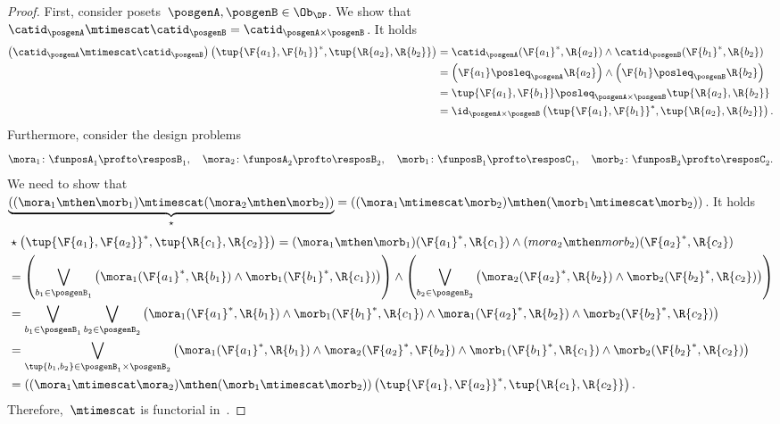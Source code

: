 \begin{proof}
  First, consider posets~$\posgenA,\posgenB\in \Ob_\DP$. We show that~$\catid_\posgenA\mtimescat \catid_\posgenB = \catid_{\posgenA\times \posgenB}$. It holds
  \begin{equation}
    \begin{aligned}
      \left( \catid_{\posgenA}\mtimescat \catid_{\posgenB}\right)
      \left( \tup{\F{a_1},\F{b_1}}^*,\tup{\R{a_2},\R{b_2}}\right)&=
      \catid_\posgenA(\F{a_1}^*,\R{a_2})\wedge \catid_\posgenB(\F{b_1}^*,\R{b_2})\\
      &=\left( \F{a_1}\posleq_\posgenA \R{a_2}\right)\wedge \left( \F{b_1}\posleq_\posgenB \R{b_2}\right)\\
      &=\tup{\F{a_1},\F{b_1}}\posleq_{\posgenA\times \posgenB}\tup{\R{a_2},\R{b_2}}\\
      &=\id_{\posgenA\times \posgenB}\left( \tup{\F{a_1},\F{b_1}}^*,\tup{\R{a_2},\R{b_2}}\right).
    \end{aligned}
  \end{equation}
  Furthermore, consider the design problems
  \begin{equation*}
    \mora_1\colon \funposA_1 \profto \resposB_1,\quad \mora_2\colon \funposA_2\profto \resposB_2, \quad \morb_1\colon \funposB_1\profto \resposC_1,\quad \morb_2\colon \funposB_2\profto \resposC_2.
  \end{equation*}
  We need to show that~$\underbrace{\left( (\mora_1\mthen \morb_1) \mtimescat (\mora_2\mthen \morb_2)\right)}_{\star}=\left( (\mora_1\mtimescat \morb_2)\mthen (\morb_1\mtimescat \morb_2)\right)$.
  It holds
  \begin{equation}
    \begin{aligned}
      &\star \left( \tup{\F{a_1},\F{a_2}}^*,\tup{\R{c_1},\R{c_2}}\right)=(\mora_1\mthen \morb_1)(\F{a_1}^*,\R{c_1})\wedge (mora_2\mthen morb_2)(\F{a_2}^*,\R{c_2})\\
      &=\left(\bigvee_{b_1\in \posgenB_1}\left( \mora_1(\F{a_1}^*,\R{b_1})\wedge \morb_1(\F{b_1}^*,\R{c_1})\right)\right) \wedge\left(\bigvee_{b_2\in \posgenB_2}\left( \mora_2(\F{a_2}^*,\R{b_2})\wedge \morb_2(\F{b_2}^*,\R{c_2})\right)\right)\\
      &=\bigvee_{b_1\in \posgenB_1}\bigvee_{b_2\in \posgenB_2} \left(\mora_1(\F{a_1}^*,\R{b_1})\wedge \morb_1(\F{b_1}^*,\R{c_1})\wedge \mora_1(\F{a_2}^*,\R{b_2})\wedge \morb_2(\F{b_2}^*,\R{c_2}) \right)\\
      &=\bigvee_{\tup{b_1,b_2}\in \posgenB_1\times \posgenB_2} \left(\mora_1(\F{a_1}^*,\R{b_1})\wedge \mora_2(\F{a_2}^*,\F{b_2})\wedge \morb_1(\F{b_1}^*,\R{c_1})\wedge \morb_2(\F{b_2}^*,\R{c_2}) \right)\\
      &=\left( (\mora_1\mtimescat \mora_2)\mthen (\morb_1\mtimescat \morb_2)\right)\left(\tup{\F{a_1},\F{a_2}}^*,\tup{\R{c_1},\R{c_2}} \right).
    \end{aligned}
  \end{equation}
  Therefore,~$\mtimescat$ is functorial in~\DP.
\end{proof}



